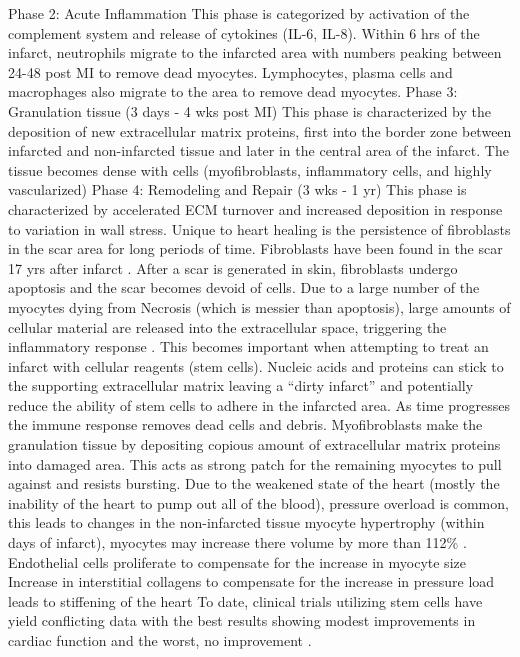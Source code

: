 \begin{outline}
\2 Phase 2: Acute Inflammation
\3 This phase is categorized by activation of the complement system and release of cytokines (IL-6, IL-8).  Within 6 hrs of the infarct, neutrophils migrate to the infarcted area with numbers peaking between 24-48 post MI to remove dead myocytes.  Lymphocytes, plasma cells and macrophages also migrate to the area to remove dead myocytes.
\2 Phase 3: Granulation tissue (3 days - 4 wks post MI)
\3 This phase is characterized by the deposition of new extracellular matrix proteins, first into the border zone between infarcted and non-infarcted tissue and later in the central area of the infarct.  The tissue becomes dense with cells (myofibroblasts, inflammatory cells, and highly vascularized)
\2 Phase 4: Remodeling and Repair (3 wks - 1 yr)
\3 This phase is characterized by accelerated ECM turnover and increased deposition in response to variation in wall stress.  Unique to heart healing is the persistence of fibroblasts in the scar area for long periods of time.  Fibroblasts have been found in the scar 17 yrs after infarct \cite{Willems:1994fk}.  After a scar is generated in skin, fibroblasts undergo apoptosis and the scar becomes devoid of cells.
\1 Due to a large number of the myocytes dying from Necrosis (which is messier than apoptosis), large amounts of cellular material are released into the extracellular space, triggering the inflammatory response \cite{Frangogiannis:2008uq}. 
This becomes important when attempting to treat an infarct with cellular reagents (stem cells). Nucleic acids and proteins can stick to the supporting extracellular matrix leaving a “dirty infarct” and potentially reduce the ability of stem cells to adhere in the infarcted area.
\2 As time progresses the immune response removes dead cells and debris.  Myofibroblasts make the granulation tissue by depositing copious amount of extracellular matrix proteins into damaged area.  This acts as strong patch for the remaining myocytes to pull against and resists bursting.
Due to the weakened state of the heart (mostly the inability of the heart to pump out all of the blood), pressure overload is common, this leads to changes in the non-infarcted tissue
\2 myocyte hypertrophy (within days of infarct), myocytes may increase there volume by more than 112\% \cite{Cleutjens:1999fk,Olivetti:1994kx}.
Endothelial cells proliferate to compensate for the increase in myocyte size
Increase in interstitial collagens to compensate for the increase in pressure load leads to stiffening of the heart
\2 To date, clinical trials utilizing stem cells have yield conflicting data with the best results showing modest improvements in cardiac function and the worst, no improvement \cite{Assmus:2010qf,Beitnes:2009vn,Erbs:2007ve,Meyer:2006ly,Meyer:2009zr,Schachinger:2006bh,Wollert:2004ys}.

\end{outline}
